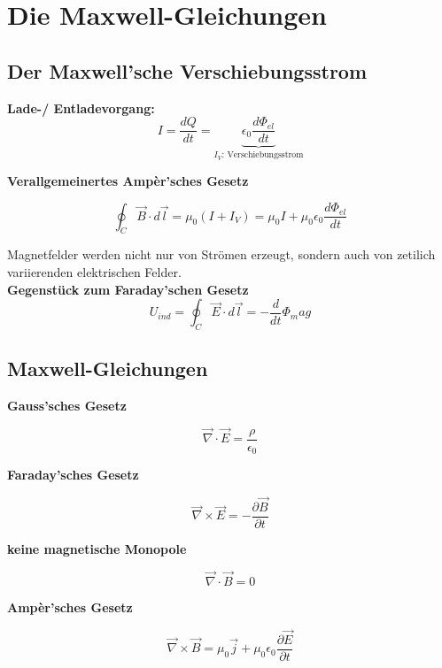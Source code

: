\section{Die Maxwell-Gleichungen}
\begin{flushleft}

\subsection{Der Maxwell'sche Verschiebungsstrom}
\textbf{Lade-/ Entladevorgang:}
\[
    I = \frac{dQ}{dt} = \underbrace{\epsilon_0 \frac{d\Phi_{el}}{dt}}_{I_V \text{: Verschiebungsstrom}}
\]

\textbf{Verallgemeinertes Ampèr'sches Gesetz}
\begin{formulabox}
    \[
        \oint_C \Vec{B} \cdot d\Vec{l} = \mu_0 \left( I + I_V \right) = \mu_0 I + \mu_0 \epsilon_0 \frac{d\Phi_{el}}{dt}
    \]
\end{formulabox}

Magnetfelder werden nicht nur von Strömen erzeugt, sondern auch von zetilich variierenden elektrischen Felder. \\[2ex]

\textbf{Gegenstück zum Faraday'schen Gesetz}
\[
    U_{ind} = \oint_C \vec{E} \cdot d\vec{l} = - \frac{d}{dt} \Phi_mag
\]

\subsection{Maxwell-Gleichungen}
\textbf{Gauss'sches Gesetz}
\begin{formulabox}
    \[
        \vec{\nabla} \cdot \vec{E} = \frac{\rho}{\epsilon_0}
    \]
\end{formulabox}

\textbf{Faraday'sches Gesetz}
\begin{formulabox}
    \[
        \vec{\nabla} \times \vec{E} = - \frac{\partial \vec{B}}{\partial t}
    \]
\end{formulabox}

\vspace{5mm}

\textbf{keine magnetische Monopole}
\begin{formulabox}
    \[
        \vec{\nabla} \cdot \vec{B} = 0
    \]
\end{formulabox}

\textbf{Ampèr'sches Gesetz}
\begin{formulabox}
    \[
        \vec{\nabla} \times \vec{B} = \mu_0 \vec{j}  + \mu_0 \epsilon_0 \frac{\partial \vec{E}}{\partial t}
    \]
\end{formulabox}


\end{flushleft}
